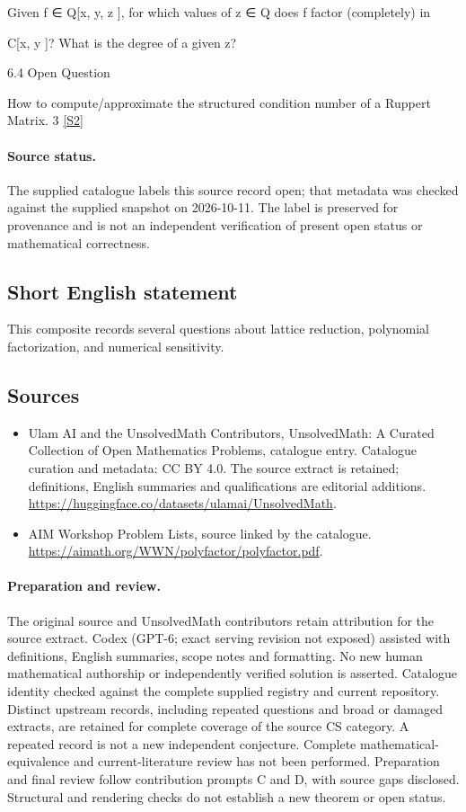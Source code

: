 \documentclass[11pt]{article}
\begin{document}
Given f ∈ Q[x, y, z ], for which values of z ∈ Q does f factor (completely) in

C[x, y ]? What is the degree of a given z?

6.4 Open Question

How to compute/approximate the structured condition number of a Ruppert Matrix. 3 \href{https://aimath.org/WWN/polyfactor/polyfactor.pdf}{[S2]}
\paragraph{Source status.}
The supplied catalogue labels this source record open; that metadata was checked against the supplied snapshot on 2026-10-11. The label is preserved for provenance and is not an independent verification of present open status or mathematical correctness.
\subsection{Short English statement}
This composite records several questions about lattice reduction, polynomial factorization, and numerical sensitivity.
\subsection{Sources}
\begin{itemize}
\item[S1] Ulam AI and the UnsolvedMath Contributors, UnsolvedMath: A Curated Collection of Open Mathematics Problems, catalogue entry. Catalogue curation and metadata: CC BY 4.0. The source extract is retained; definitions, English summaries and qualifications are editorial additions.
\url{https://huggingface.co/datasets/ulamai/UnsolvedMath}.
\item[S2] AIM Workshop Problem Lists, source linked by the catalogue.
\url{https://aimath.org/WWN/polyfactor/polyfactor.pdf}.
\end{itemize}
\paragraph{Preparation and review.}
The original source and UnsolvedMath contributors retain attribution for the source extract. Codex (GPT-6; exact serving revision not exposed) assisted with definitions, English summaries, scope notes and formatting. No new human mathematical authorship or independently verified solution is asserted. Catalogue identity checked against the complete supplied registry and current repository. Distinct upstream records, including repeated questions and broad or damaged extracts, are retained for complete coverage of the source CS category. A repeated record is not a new independent conjecture. Complete mathematical-equivalence and current-literature review has not been performed. Preparation and final review follow contribution prompts C and D, with source gaps disclosed. Structural and rendering checks do not establish a new theorem or open status.
\label{end:statement}
\end{document}

